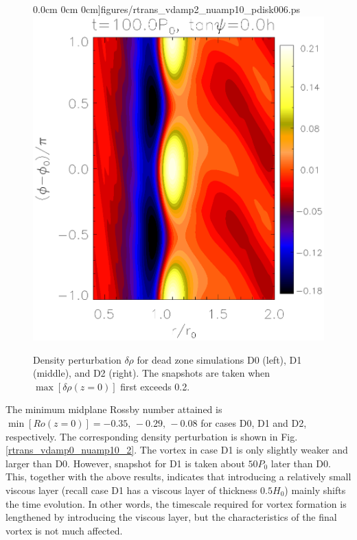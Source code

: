 \begin{figure}
     0.0cm 0cm
     0cm]{figures/rtrans_vdamp2_nuamp10_pdisk006.ps}\includegraphics[scale=.27,clip=true,clip=true,trim=2.3cm
     0.0cm 0cm
     0cm]{figures/rtrans_vdamp3_nuamp10_pdisk010.ps}%
   \caption{Density perturbation $\delta\rho$ for dead zone simulations
     D0 (left), D1 (middle), and D2 (right). The snapshots are
     taken when $\max[\delta\rho(z=0)]$ first exceeds 0.2. 
     \label{rtrans_vdamp0_nuamp10}}
\end{figure}


The minimum midplane Rossby number attained is
$\min[Ro(z=0)]=-0.35,\,-0.29,\,-0.08$ for cases D0, D1 and D2,
respectively. The corresponding density perturbation is shown in
Fig. \ref{rtrans_vdamp0_nuamp10_2}. The vortex in case D1 is only slightly
weaker and larger than D0. However, snapshot for D1 is taken about
$50P_0$ later than D0. This, together with the above results,
indicates that introducing a relatively small viscous layer (recall
case D1 has a viscous layer of thickness $0.5H_0$) mainly shifts the
time evolution. In other words, the timescale required for vortex
formation is lengthened by introducing the viscous layer, but the
characteristics of the final vortex is not much affected. 

